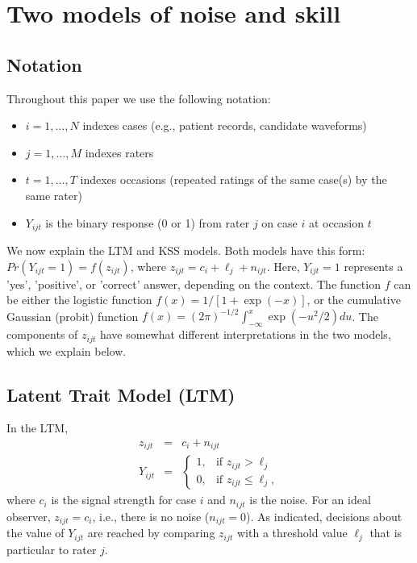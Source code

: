 \section*{Two models of noise and skill}\label{2-models}

\subsection*{Notation}
Throughout this paper we use the following notation:
\begin{itemize}
    \item $i = 1,\ldots,N$ indexes cases (e.g., patient records, candidate waveforms)
    \item $j = 1,\ldots,M$ indexes raters
    \item $t = 1,\ldots,T$ indexes occasions (repeated ratings of the same case(s) by the same rater)
    \item $Y_{ijt}$ is the binary response (0 or 1) from rater $j$ on case $i$ at occasion $t$
\end{itemize}

We now explain the LTM and KSS models. Both models have this form: $Pr(Y_{ijt}=1) = f(z_{ijt})$, where $z_{ijt} = c_i + \ell_j + n_{ijt}$. Here, $Y_{ijt}=1$ represents a 'yes', 'positive', or 'correct' answer, depending on the context. The function $f$ can be either the logistic function $f(x) = 1/[1+\exp(-x)]$, or the cumulative Gaussian (probit) function $f(x) = (2\pi)^{-1/2}\int_{-\infty}^x \exp(-u^2/2)du$. The components of $z_{ijt}$ have somewhat different interpretations in the two models, which we explain below.

\subsection*{Latent Trait Model (LTM)}\label{section-LTM}
In the LTM,
\begin{eqnarray*}
  z_{ijt} &=& c_i + n_{ijt} \\
  Y_{ijt}&=&\begin{cases}
    1, & \text{if $z_{ijt}>\ell_j$}\\
    0, & \text{if $z_{ijt}\leq \ell_j$},
  \end{cases}
\end{eqnarray*}
where $c_i$ is the signal strength for case $i$ and $n_{ijt}$ is the noise. For an ideal observer, $z_{ijt} = c_i$, i.e., there is no noise ($n_{ijt}=0$). As indicated, decisions about the value of $Y_{ijt}$ are reached by comparing $z_{ijt}$ with a threshold value $\ell_j$ that is particular to rater $j$.

